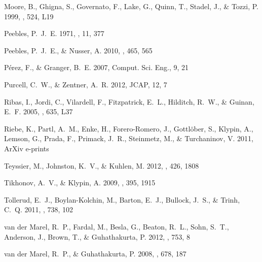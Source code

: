 \documentclass{emulateapj}
\begin{document}
\begin{thebibliography}{28}
{Moore}, B., {Ghigna}, S., {Governato}, F., {Lake}, G., {Quinn}, T., {Stadel},
  J., \& {Tozzi}, P. 1999, \apjl, 524, L19

{Peebles}, P.~J.~E. 1971, \aap, 11, 377

{Peebles}, P.~J.~E., \& {Nusser}, A. 2010, \nat, 465, 565

P\'erez, F., \& Granger, B.~E. 2007, {C}omput. {S}ci. {E}ng., 9, 21

{Purcell}, C.~W., \& {Zentner}, A.~R. 2012, {JCAP}, 12, 7

{Ribas}, I., {Jordi}, C., {Vilardell}, F., {Fitzpatrick}, E.~L., {Hilditch},
  R.~W., \& {Guinan}, E.~F. 2005, \apjl, 635, L37

{Riebe}, K., {Partl}, A.~M., {Enke}, H., {Forero-Romero}, J., {Gottl{\"o}ber}, S.,
  {Klypin}, A., {Lemson}, G., {Prada}, F., {Primack}, J.~R., {Steinmetz}, M.,
  \& {Turchaninov}, V. 2011, ArXiv e-prints

{Teyssier}, M., {Johnston}, K.~V., \& {Kuhlen}, M. 2012, \mnras, 426, 1808

{Tikhonov}, A.~V., \& {Klypin}, A. 2009, \mnras, 395, 1915

{Tollerud}, E.~J., {Boylan-Kolchin}, M., {Barton}, E.~J., {Bullock}, J.~S., \&
  {Trinh}, C.~Q. 2011, \apj, 738, 102

{van der Marel}, R.~P., {Fardal}, M., {Besla}, G., {Beaton}, R.~L., {Sohn},
  S.~T., {Anderson}, J., {Brown}, T., \& {Guhathakurta}, P. 2012, \apj, 753, 8

{van der Marel}, R.~P., \& {Guhathakurta}, P. 2008, \apj, 678, 187

\end{thebibliography}
\end{document}
